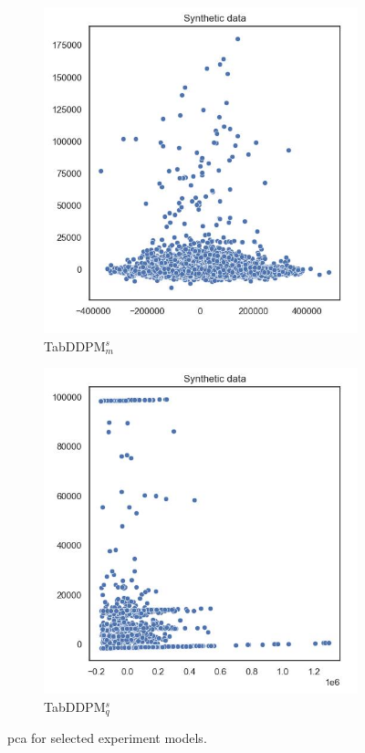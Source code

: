 \begin{figure}[H]
	\begin{subfigure}{0.3\textwidth}
		\centering
		\includegraphics[width=\textwidth]{images/pca/tab-ddpm-simTune-minmax.jpg}
		\caption{TabDDPM$^{s}_m$}
	\end{subfigure}
	\begin{subfigure}{0.3\textwidth}
		\centering
		\includegraphics[width=\textwidth]{images/pca/tab-ddpm-simTune.jpg}
		\caption{TabDDPM$^{s}_q$}
	\end{subfigure}
	\caption[PCA plots Experiment Models]{\gls{pca} for selected experiment models.}
	\label{fig:pca_diffusion}
\end{figure}

